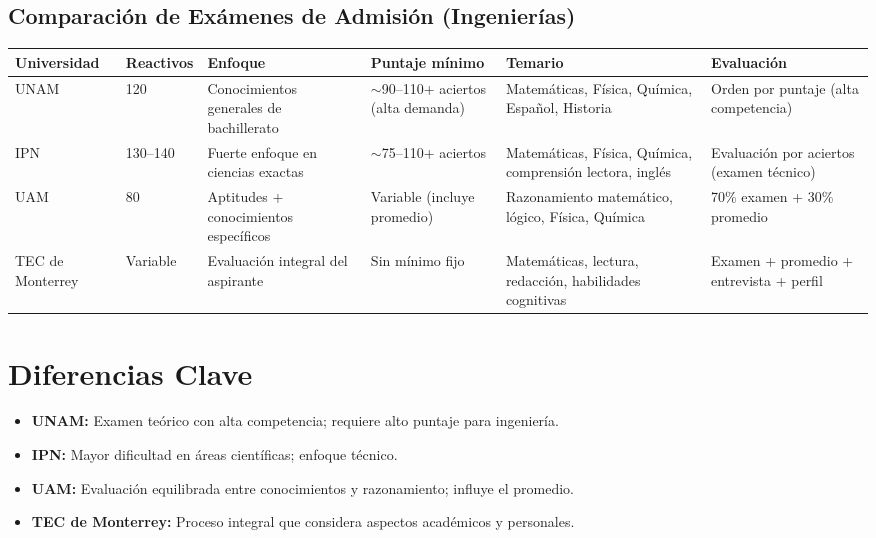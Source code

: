 \documentclass[12pt]{article}
\begin{document}
\begin{center}
\section*{Comparación de Exámenes de Admisión (Ingenierías)}
\end{center}

\renewcommand{\arraystretch}{1.3}

\begin{center}
\begin{tabularx}{\textwidth}{|p{2.5cm}|p{2cm}|X|X|X|X|}
\hline
\textbf{Universidad} & \textbf{Reactivos} & \textbf{Enfoque} & \textbf{Puntaje mínimo} & \textbf{Temario} & \textbf{Evaluación} \\
\hline

UNAM & 120 & Conocimientos generales de bachillerato & $\sim$90--110+ aciertos (alta demanda) & Matemáticas, Física, Química, Español, Historia & Orden por puntaje (alta competencia) \\
\hline

IPN & 130--140 & Fuerte enfoque en ciencias exactas & $\sim$75--110+ aciertos & Matemáticas, Física, Química, comprensión lectora, inglés & Evaluación por aciertos (examen técnico) \\
\hline

UAM & 80 & Aptitudes + conocimientos específicos & Variable (incluye promedio) & Razonamiento matemático, lógico, Física, Química & 70\% examen + 30\% promedio \\
\hline

TEC de Monterrey & Variable & Evaluación integral del aspirante & Sin mínimo fijo & Matemáticas, lectura, redacción, habilidades cognitivas & Examen + promedio + entrevista + perfil \\
\hline

\end{tabularx}
\end{center}

\vspace{0.5cm}

\section*{Diferencias Clave}

\begin{itemize}
\item \textbf{UNAM:} Examen teórico con alta competencia; requiere alto puntaje para ingeniería.
\item \textbf{IPN:} Mayor dificultad en áreas científicas; enfoque técnico.
\item \textbf{UAM:} Evaluación equilibrada entre conocimientos y razonamiento; influye el promedio.
\item \textbf{TEC de Monterrey:} Proceso integral que considera aspectos académicos y personales.
\end{itemize}
\end{document}
